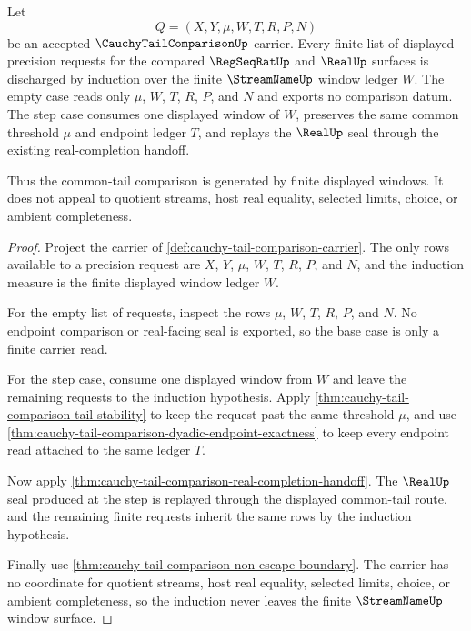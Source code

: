 \begin{theorem}
\label{thm:cauchy-tail-comparison-finite-window-induction}
Let
$$
Q=(X,Y,\mu,W,T,R,P,N)
$$
be an accepted $\CauchyTailComparisonUp$ carrier. Every finite list of displayed precision requests for the compared $\RegSeqRatUp$ and $\RealUp$ surfaces is discharged by induction over the finite $\StreamNameUp$ window ledger $W$. The empty case reads only $\mu$, $W$, $T$, $R$, $P$, and $N$ and exports no comparison datum. The step case consumes one displayed window of $W$, preserves the same common threshold $\mu$ and endpoint ledger $T$, and replays the $\RealUp$ seal through the existing real-completion handoff.

Thus the common-tail comparison is generated by finite displayed windows. It does not appeal to quotient streams, host real equality, selected limits, choice, or ambient completeness.
\end{theorem}
\begin{proof}
Project the carrier of \autoref{def:cauchy-tail-comparison-carrier}. The only rows available to a precision request are $X$, $Y$, $\mu$, $W$, $T$, $R$, $P$, and $N$, and the induction measure is the finite displayed window ledger $W$.

For the empty list of requests, inspect the rows $\mu$, $W$, $T$, $R$, $P$, and $N$. No endpoint comparison or real-facing seal is exported, so the base case is only a finite carrier read.

For the step case, consume one displayed window from $W$ and leave the remaining requests to the induction hypothesis. Apply \autoref{thm:cauchy-tail-comparison-tail-stability} to keep the request past the same threshold $\mu$, and use \autoref{thm:cauchy-tail-comparison-dyadic-endpoint-exactness} to keep every endpoint read attached to the same ledger $T$.

Now apply \autoref{thm:cauchy-tail-comparison-real-completion-handoff}. The $\RealUp$ seal produced at the step is replayed through the displayed common-tail route, and the remaining finite requests inherit the same rows by the induction hypothesis.

Finally use \autoref{thm:cauchy-tail-comparison-non-escape-boundary}. The carrier has no coordinate for quotient streams, host real equality, selected limits, choice, or ambient completeness, so the induction never leaves the finite $\StreamNameUp$ window surface.
\end{proof}


